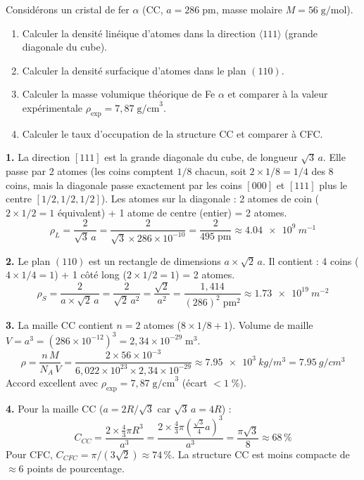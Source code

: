 \documentclass[12pt,a4paper]{article}
\begin{document}
\begin{boiteexercice}
Considérons un cristal de fer $\alpha$ (CC, $a=286\;\text{pm}$, masse molaire $M=56\;\text{g/mol}$).
\begin{enumerate}
  \item Calculer la densité linéique d'atomes dans la direction $\langle111\rangle$ (grande diagonale du cube).
  \item Calculer la densité surfacique d'atomes dans le plan $(110)$.
  \item Calculer la masse volumique théorique de Fe $\alpha$ et comparer à la valeur expérimentale $\rho_\text{exp}=7{,}87\;\text{g/cm}^3$.
  \item Calculer le taux d'occupation de la structure CC et comparer à CFC.
\end{enumerate}
\end{boiteexercice}

\begin{boitecorrige}
\textbf{1.} La direction $[111]$ est la grande diagonale du cube, de longueur $\sqrt{3}\,a$. Elle passe par 2 atomes (les coins comptent $1/8$ chacun, soit $2\times 1/8 = 1/4$ des 8 coins, mais la diagonale passe exactement par les coins $[000]$ et $[111]$ plus le centre $[1/2,1/2,1/2]$). Les atomes sur la diagonale : 2 atomes de coin ($2\times 1/2 = 1$ équivalent) + 1 atome de centre (entier) = 2 atomes.
\[
\rho_L = \frac{2}{\sqrt{3}\,a} = \frac{2}{\sqrt{3}\times286\times10^{-10}} = \frac{2}{495\;\text{pm}} \approx \qty{4.04e9}{m^{-1}}
\]

\textbf{2.} Le plan $(110)$ est un rectangle de dimensions $a\times\sqrt{2}\,a$. Il contient : 4 coins ($4\times 1/4=1$) + 1 côté long ($2\times 1/2=1$) = 2 atomes.
\[
\rho_S = \frac{2}{a\times\sqrt{2}\,a} = \frac{2}{\sqrt{2}\,a^2} = \frac{\sqrt{2}}{a^2} = \frac{1{,}414}{(286)^2\;\text{pm}^2} \approx \qty{1.73e19}{m^{-2}}
\]

\textbf{3.} La maille CC contient $n=2$ atomes ($8\times1/8+1$). Volume de maille $V=a^3=(286\times10^{-12})^3=2{,}34\times10^{-29}\;\text{m}^3$.
\[
\rho = \frac{n\,M}{N_A\,V} = \frac{2\times56\times10^{-3}}{6{,}022\times10^{23}\times2{,}34\times10^{-29}} \approx \qty{7.95e3}{kg/m^3} = \qty{7.95}{g/cm^3}
\]
Accord excellent avec $\rho_\text{exp}=7{,}87\;\text{g/cm}^3$ (écart $<\!1\;\%$).

\textbf{4.} Pour la maille CC ($a=2R/\sqrt{3}$ car $\sqrt{3}\,a=4R$) :
\[
C_{CC} = \frac{2\times\frac{4}{3}\pi R^3}{a^3} = \frac{2\times\frac{4}{3}\pi\left(\frac{\sqrt{3}}{4}a\right)^3}{a^3} = \frac{\pi\sqrt{3}}{8} \approx 68\,\%
\]
Pour CFC, $C_{CFC}=\pi/(3\sqrt{2})\approx74\,\%$. La structure CC est moins compacte de $\approx6$ points de pourcentage.
\end{boitecorrige}
\end{document}
